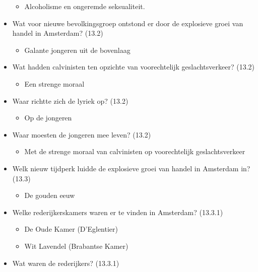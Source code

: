 \begin{itemize}
  \begin{itemize}
  \itemsep1pt\parskip0pt
  \item
    Alcoholisme en ongeremde seksualiteit.
  \end{itemize}
\item
  Wat voor nieuwe bevolkingsgroep ontstond er door de explosieve groei
  van handel in Amsterdam? (13.2)

  \begin{itemize}
  \itemsep1pt\parskip0pt
  \item
    Galante jongeren uit de bovenlaag
  \end{itemize}
\item
  Wat hadden calvinisten ten opzichte van voorechtelijk
  geslachtsverkeer? (13.2)

  \begin{itemize}
  \itemsep1pt\parskip0pt
  \item
    Een strenge moraal
  \end{itemize}
\item
  Waar richtte zich de lyriek op? (13.2)

  \begin{itemize}
  \itemsep1pt\parskip0pt
  \item
    Op de jongeren
  \end{itemize}
\item
  Waar moesten de jongeren mee leven? (13.2)

  \begin{itemize}
  \itemsep1pt\parskip0pt
  \item
    Met de strenge moraal van calvinisten op voorechtelijk
    geslachtsverkeer
  \end{itemize}
\item
  Welk nieuw tijdperk luidde de explosieve groei van handel in Amsterdam
  in? (13.3)

  \begin{itemize}
  \itemsep1pt\parskip0pt
  \item
    De gouden eeuw
  \end{itemize}
\item
  Welke rederijkerskamers waren er te vinden in Amsterdam? (13.3.1)

  \begin{itemize}
  \itemsep1pt\parskip0pt
  \item
    De Oude Kamer (D'Eglentier)
  \item
    Wit Lavendel (Brabantse Kamer)
  \end{itemize}
\item
  Wat waren de rederijkers? (13.3.1)


\end{itemize}
